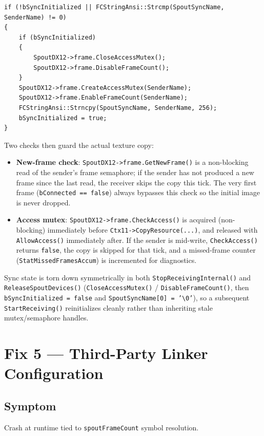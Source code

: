 \documentclass[11pt,a4paper]{article}
\begin{document}
\begin{lstlisting}[style=cpp]
if (!bSyncInitialized || FCStringAnsi::Strcmp(SpoutSyncName, SenderName) != 0)
{
    if (bSyncInitialized)
    {
        SpoutDX12->frame.CloseAccessMutex();
        SpoutDX12->frame.DisableFrameCount();
    }
    SpoutDX12->frame.CreateAccessMutex(SenderName);
    SpoutDX12->frame.EnableFrameCount(SenderName);
    FCStringAnsi::Strncpy(SpoutSyncName, SenderName, 256);
    bSyncInitialized = true;
}
\end{lstlisting}

Two checks then guard the actual texture copy:
\begin{itemize}
    \item \textbf{New-frame check}: \texttt{SpoutDX12->frame.GetNewFrame()}
        is a non-blocking read of the sender's frame semaphore; if the
        sender has not produced a new frame since the last read, the
        receiver skips the copy this tick. The very first frame
        (\texttt{bConnected == false}) always bypasses this check so the
        initial image is never dropped.
    \item \textbf{Access mutex}: \texttt{SpoutDX12->frame.CheckAccess()} is
        acquired (non-blocking) immediately before
        \texttt{Ctx11->CopyResource(...)}, and released with
        \texttt{AllowAccess()} immediately after. If the sender is
        mid-write, \texttt{CheckAccess()} returns \texttt{false}, the copy
        is skipped for that tick, and a missed-frame counter
        (\texttt{StatMissedFramesAccum}) is incremented for diagnostics.
\end{itemize}

Sync state is torn down symmetrically in both
\texttt{StopReceivingInternal()} and \texttt{ReleaseSpoutDevices()}
(\texttt{CloseAccessMutex()} / \texttt{DisableFrameCount()}, then
\texttt{bSyncInitialized = false} and \texttt{SpoutSyncName[0] = '\textbackslash 0'}), so a
subsequent \texttt{StartReceiving()} reinitializes cleanly rather than
inheriting stale mutex/semaphore handles.

\section{Fix 5 --- Third-Party Linker Configuration}
\label{sec:linker}

\subsection{Symptom}
Crash at runtime tied to \texttt{spoutFrameCount} symbol resolution.
\end{document}
